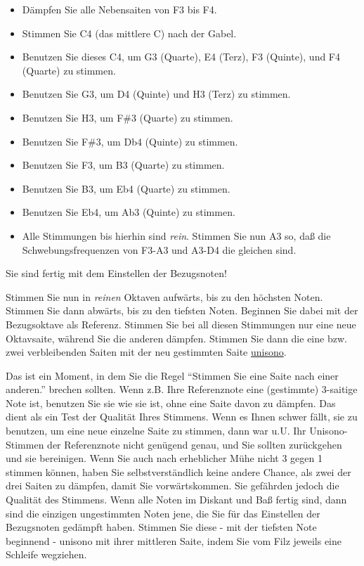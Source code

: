 \begin{itemize} 
 \item Dämpfen Sie alle Nebensaiten von F3 bis F4.
 \item Stimmen Sie C4 (das mittlere C) nach der Gabel.
 \item Benutzen Sie dieses C4, um G3 (Quarte), E4 (Terz), F3 (Quinte), und F4 (Quarte) zu stimmen.
 \item Benutzen Sie G3, um D4 (Quinte) und H3 (Terz) zu stimmen.
 \item Benutzen Sie H3, um F\#3 (Quarte) zu stimmen.
 \item Benutzen Sie F\#3, um Db4 (Quinte) zu stimmen.
 \item Benutzen Sie F3, um B3 (Quarte) zu stimmen.
 \item Benutzen Sie B3, um Eb4 (Quarte) zu stimmen.
 \item Benutzen Sie Eb4, um Ab3 (Quinte) zu stimmen.
 \item Alle Stimmungen bis hierhin sind \textit{rein}. Stimmen Sie nun A3 so, daß die Schwebungsfrequenzen von F3-A3 und A3-D4 die gleichen sind.
\end{itemize}

Sie sind fertig mit dem Einstellen der Bezugsnoten!


\hypertarget{c2_6_kirn2}{}

Stimmen Sie nun in \textit{reinen} Oktaven aufwärts, bis zu den höchsten Noten.
Stimmen Sie dann abwärts, bis zu den tiefsten Noten.
Beginnen Sie dabei mit der Bezugsoktave als Referenz.
Stimmen Sie bei all diesen Stimmungen nur eine neue Oktavsaite, während Sie die anderen dämpfen.
Stimmen Sie dann die eine bzw. zwei verbleibenden Saiten mit der neu gestimmten Saite \hyperref[c2_5_unis]{unisono}.

Das ist ein Moment, in dem Sie die Regel \enquote{Stimmen Sie eine Saite nach einer anderen.} brechen sollten.
Wenn z.B. Ihre Referenznote eine (gestimmte) 3-saitige Note ist, benutzen Sie sie wie sie ist, ohne eine Saite davon zu dämpfen.
Das dient als ein Test der Qualität Ihres Stimmens.
Wenn es Ihnen schwer fällt, sie zu benutzen, um eine neue einzelne Saite zu stimmen, dann war u.U. Ihr Unisono-Stimmen der Referenznote nicht genügend genau, und Sie sollten zurückgehen und sie bereinigen.
Wenn Sie auch nach erheblicher Mühe nicht 3 gegen 1 stimmen können, haben Sie selbstverständlich keine andere Chance, als zwei der drei Saiten zu dämpfen, damit Sie vorwärtskommen.
Sie gefährden jedoch die Qualität des Stimmens.
Wenn alle Noten im Diskant und Baß fertig sind, dann sind die einzigen ungestimmten Noten jene, die Sie für das Einstellen der Bezugsnoten gedämpft haben.
Stimmen Sie diese - mit der tiefsten Note beginnend - unisono mit ihrer mittleren Saite, indem Sie vom Filz jeweils eine Schleife wegziehen.
 

